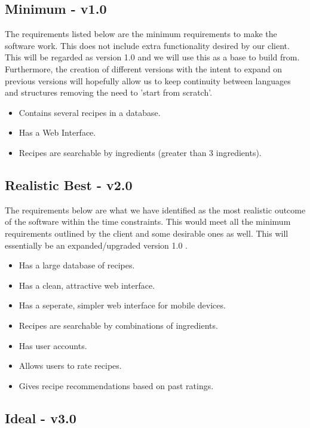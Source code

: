 \documentclass[12pt]{article}
\begin{document}
\subsection{Minimum - v1.0}

The requirements listed below are the minimum requirements to make the software work. This does not include extra functionality desired by our client. This will be regarded as version 1.0 and we will use this as a base to build from. 
Furthermore, the creation of different versions with the intent to expand on previous versions will hopefully allow us to keep 
continuity between languages and structures removing the need to 'start from scratch'.

\begin{itemize}
	\item Contains several recipes in a database.
	\item Has a Web Interface.
	\item Recipes are searchable by ingredients (greater than 3 ingredients).

\end{itemize}

\subsection{Realistic Best - v2.0}

The requirements below are what we have identified as the most realistic outcome of the software within the time constraints. This would meet all the minimum requirements outlined by the client and some desirable ones as well. This will
essentially be an expanded/upgraded version 1.0 .

\begin{itemize}
	\item Has a large database of recipes.
	\item Has a clean, attractive web interface.
	\item Has a seperate, simpler web interface for mobile devices.
	\item Recipes are searchable by combinations of ingredients.
	\item Has user accounts.
	\item Allows users to rate recipes.
	\item Gives recipe recommendations based on past ratings.
\end{itemize}

\subsection{Ideal - v3.0}
\end{document}
